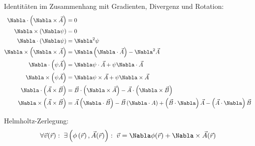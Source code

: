 \documentclass[11pt]{article}
\numberwithin{equation}{section}
\begin{document}
        Identitäten im Zusammenhang mit Gradienten, Divergenz und Rotation:
    		\begin{equation}
          \begin{aligned}
            \Nabla\cdot\left(\Nabla\times\vec{A}\right) &= 0 \\
            \Nabla\times\left(\Nabla\psi\right) &= 0 \\
            \Nabla\cdot\left(\Nabla\psi\right) &= \Nabla^2\psi \\
            \Nabla\times\left(\Nabla\times\vec{A}\right) &= \Nabla\left(\Nabla\cdot\vec{A}\right) -\Nabla^2\vec{A} \\
            \Nabla\cdot\left(\psi\vec{A}\right) &= \Nabla\psi\cdot\vec{A} + \psi\Nabla\cdot\vec{A}\\
            \Nabla\times\left(\psi\vec{A}\right) &= \Nabla\psi\times\vec{A} + \psi\Nabla\times\vec{A} \\
            \Nabla\cdot\left(\vec{A}\times\vec{B}\right) &= \vec{B}\cdot\left(\Nabla\times\vec{A}\right) - \vec{A}\cdot\left(\Nabla\times\vec{B}\right) \\
            \Nabla\times\left(\vec{A}\times\vec{B}\right) &= \vec{A}\left(\Nabla\cdot\vec{B}\right) - \vec{B}\left(\Nabla\cdot{A}\right) + \left(\vec{B}\cdot\Nabla\right)\vec{A} - \left(\vec{A}\cdot\Nabla\right)\vec{B} \\
          \end{aligned}
    		\end{equation}

        Helmholtz-Zerlegung:
    		\begin{equation}
          \forall \vec{v}(\vec{r}):\; \exists\left(\phi\left(\vec{r}\right),\vec{A}(\vec{r})\right):\;\vec{v} = \Nabla\phi(\vec{r}) + \Nabla\times\vec{A}(\vec{r})
    		\end{equation}
\end{document}
